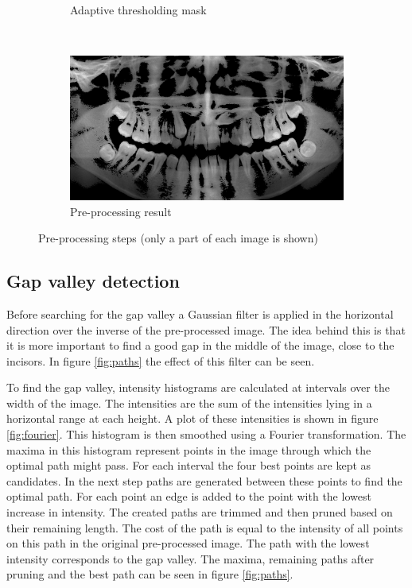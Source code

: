 \documentclass[a4paper,10pt]{article}
\begin{document}
\begin{figure}[htbp]
\begin{subfigure}{0.45\textwidth}
		\caption{Adaptive thresholding mask}
		\label{fig:ad_thresh}
	\end{subfigure}
	~
	\begin{subfigure}{0.45\textwidth}
		\centering
		\includegraphics[width=\textwidth, trim=20cm 5cm 20cm 10cm, clip]{result}
		\caption{Pre-processing result}
		\label{fig:result}
	\end{subfigure}
	\caption{Pre-processing steps (only a part of each image is shown)}
	\label{fig:pre_processing}
\end{figure}

\subsection{Gap valley detection}
Before searching for the gap valley a Gaussian filter is applied in the horizontal direction over the inverse of the pre-processed image. The idea behind this is that it is more important to find a good gap in the middle of the image, close to the incisors. In figure \ref{fig:paths} the effect of this filter can be seen.

To find the gap valley, intensity histograms are calculated at intervals over the width of the image. The intensities are the sum of the intensities lying in a horizontal range at each height. A plot of these intensities is shown in figure \ref{fig:fourier}. This histogram is then smoothed using a Fourier transformation. The maxima in this histogram represent points in the image through which the optimal path might pass. For each interval the four best points are kept as candidates. In the next step paths are generated between these points to find the optimal path. For each point an edge is added to the point with the lowest increase in intensity. The created paths are trimmed and then pruned based on their remaining length. The cost of the path is equal to the intensity of all points on this path in the original pre-processed image. The path with the lowest intensity corresponds to the gap valley. The maxima, remaining paths after pruning and the best path can be seen in figure \ref{fig:paths}.
\end{document}
